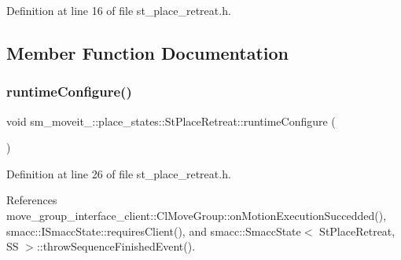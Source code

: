 Definition at line 16 of file st\+\_\+place\+\_\+retreat.\+h.



\subsection{Member Function Documentation}
\mbox{\label{structsm__moveit__2_1_1place__states_1_1StPlaceRetreat_ab3c8e46bce1643ab6ecd415ecf1af6f6}} 
\subsubsection{\texorpdfstring{runtime\+Configure()}{runtimeConfigure()}}
{\footnotesize\ttfamily void sm\+\_\+moveit\+\_\+::place\+\_\+states\+::\+St\+Place\+Retreat\+::runtime\+Configure (\begin{DoxyParamCaption}{ }\end{DoxyParamCaption})\hspace{0.3cm}{\ttfamily [inline]}}



Definition at line 26 of file st\+\_\+place\+\_\+retreat.\+h.



References move\+\_\+group\+\_\+interface\+\_\+client\+::\+Cl\+Move\+Group\+::on\+Motion\+Execution\+Succedded(), smacc\+::\+I\+Smacc\+State\+::requires\+Client(), and smacc\+::\+Smacc\+State$<$ St\+Place\+Retreat, S\+S $>$\+::throw\+Sequence\+Finished\+Event().


